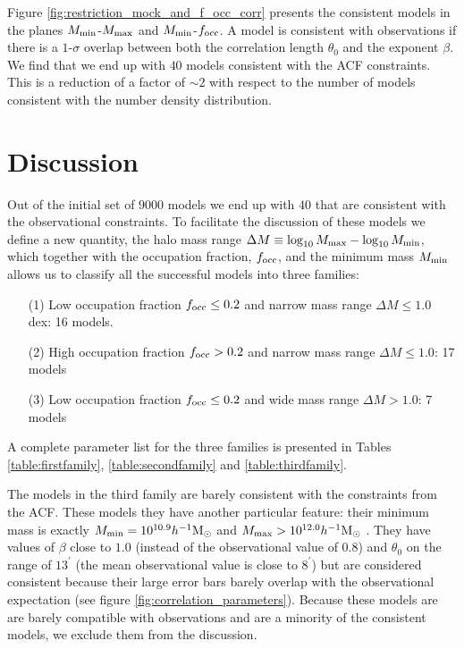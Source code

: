\documentclass{emulateapj}
\newcommand{\hMsun}{{\ifmmode{h^{-1}{\rm
        {M_{\odot}}}}\else{$h^{-1}{\rm{M_{\odot}}}$}\fi}}
\begin{document}
Figure \ref{fig:restriction_mock_and_f_occ_corr} presents the
consistent models in the planes $M_{\rm min}$-$M_{\rm
  max}$ and $M_{\rm   min}$-$f_{\rm occ}$. A model is consistent with
observations if there is a $1$-$\sigma$ overlap between both the
correlation length $\theta_0$ and the exponent $\beta$.  We find that
we end up with $40$ models consistent with the ACF constraints.  This
is a reduction of a factor of $\sim 2$ with respect to the number of
models consistent with the number density distribution.



\section{Discussion}
\label{sec:discussion}




Out of the initial set of $9000$ models we end up with $40$ that are
consistent with the observational constraints. To facilitate the
discussion of these models we define a new quantity, the halo mass
range $\Delta M\equiv \log_{10}M_{\rm max} - \log_{10}M_{\rm  min}$, which
together with the occupation fraction, $f_{\rm occ}$, and the minimum
mass $M_{\rm min}$ allows us to classify all the successful models into
three families:     
  

\begin{itemize}
\item[(1)] Low occupation fraction $f_{\rm occ}\leq 0.2$ and narrow
  mass range $\Delta M\leq 1.0$ 
  dex: 16 models. 
\item[(2)] High occupation fraction $f_{\rm occ}> 0.2$ and
  narrow mass range $\Delta M\leq 1.0$: 17 models 
\item[(3)] Low occupation fraction $f_{\rm occ}\leq 0.2$ 
  and wide mass range $\Delta M>1.0$: 7 models
\end{itemize}


A complete parameter list for the three families is presented in Tables
\ref{table:firstfamily}, \ref{table:secondfamily}  and 
\ref{table:thirdfamily}.  

The models in the third family are barely consistent with the
  constraints from the ACF. These models they have another particular
  feature: their minimum mass is exactly $M_{\rm min}=10^{10.9}\hMsun$
  and $M_{\rm max}>10^{12.0}\hMsun$ . They have values of $\beta$
  close to $1.0$ (instead of the observational value of $0.8$) and
  $\theta_0$ on the range of $13^{\prime}$ (the mean observational
  value is close to $8^{\prime}$) but are considered consistent
  because their large error bars barely overlap with the observational
  expectation (see figure \ref{fig:correlation_parameters}).
  Because these models are are barely compatible with observations and
  are a minority of the consistent models, we exclude them from the
  discussion.
\end{document}
